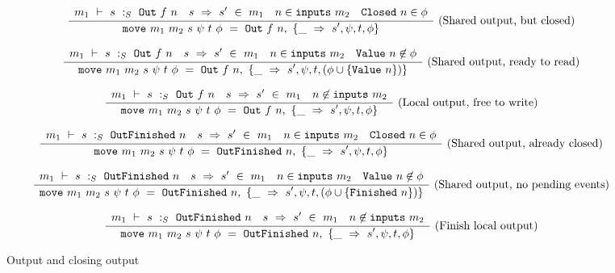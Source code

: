 \begin{figure*}


$$
\frac {\displaystyle 
    \begin{array}{lccr}  m_1 ~\vdash~ s ~:_S~ \mathtt{Out}~f~n  &  s ~\Rightarrow~ s' ~\in~m_1  &  n \in \mathtt{inputs}~m_2  &  \mathtt{Closed}~n \in \phi  \end{array}
} {\displaystyle 
    \mathtt{move}~m_1~m_2~s~\psi~t~\phi~=~\mathtt{Out}~f~n,~\{\_~\Rightarrow~s',\psi,t,\phi\}
} \ 
\textrm{(Shared output, but closed)}
$$

$$
\frac {\displaystyle 
    \begin{array}{lccr}  m_1 ~\vdash~ s ~:_S~ \mathtt{Out}~f~n  &  s ~\Rightarrow~ s' ~\in~m_1  &  n \in \mathtt{inputs}~m_2  &  \mathtt{Value}~n \not\in \phi  \end{array}
} {\displaystyle 
    \mathtt{move}~m_1~m_2~s~\psi~t~\phi~=~\mathtt{Out}~f~n,~\{\_~\Rightarrow~s', \psi, t, (\phi \cup \{ \mathtt{Value}~n \}) \}
} \ 
\textrm{(Shared output, ready to read)}
$$

$$
\frac {\displaystyle 
    \begin{array}{lcr}  m_1 ~\vdash~ s ~:_S~ \mathtt{Out}~f~n  &  s ~\Rightarrow~ s' ~\in~m_1  &  n \not\in \mathtt{inputs}~m_2  \end{array}
} {\displaystyle 
    \mathtt{move}~m_1~m_2~s~\psi~t~\phi~=~\mathtt{Out}~f~n,~\{\_~\Rightarrow~s',\psi,t,\phi\}
} \ 
\textrm{(Local output, free to write)}
$$

$$
\frac {\displaystyle 
    \begin{array}{lccr}  m_1 ~\vdash~ s ~:_S~ \mathtt{OutFinished}~n  &  s ~\Rightarrow~ s' ~\in~m_1  &  n \in \mathtt{inputs}~m_2  &  \mathtt{Closed}~n \in \phi  \end{array}
} {\displaystyle 
    \mathtt{move}~m_1~m_2~s~\psi~t~\phi~=~\mathtt{OutFinished}~n,~\{\_~\Rightarrow~s',\psi,t,\phi\}
} \ 
\textrm{(Shared output, already closed)}
$$

$$
\frac {\displaystyle 
    \begin{array}{lccr}  m_1 ~\vdash~ s ~:_S~ \mathtt{OutFinished}~n  &  s ~\Rightarrow~ s' ~\in~m_1  &  n \in \mathtt{inputs}~m_2  &  \mathtt{Value}~n \not\in \phi  \end{array}
} {\displaystyle 
    \mathtt{move}~m_1~m_2~s~\psi~t~\phi~=~\mathtt{OutFinished}~n,~\{\_~\Rightarrow~s',\psi,t,(\phi \cup \{ \mathtt{Finished}~n \})\}
} \ 
\textrm{(Shared output, no pending events)}
$$

$$
\frac {\displaystyle 
    \begin{array}{lcr}  m_1 ~\vdash~ s ~:_S~ \mathtt{OutFinished}~n  &  s ~\Rightarrow~ s' ~\in~m_1  &  n \not\in \mathtt{inputs}~m_2  \end{array}
} {\displaystyle 
    \mathtt{move}~m_1~m_2~s~\psi~t~\phi~=~\mathtt{OutFinished}~n,~\{\_~\Rightarrow~s',\psi,t,\phi\}
} \ 
\textrm{(Finish local output)}
$$

\caption{Output and closing output}
\label{fig:merge:gen:out}
\end{figure*}

